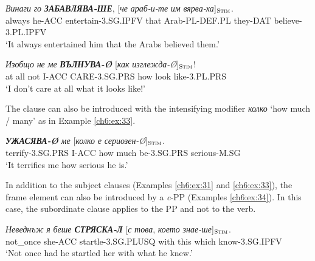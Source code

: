 \documentclass[output=paper,colorlinks,citecolor=brown]{langscibook}
\begin{document}
\begin{exe}  
\ex  \label{ch6:ex:31}
\gll \textit{Винаги} {\textit{го}} {\textit{\textbf{ЗАБАВЛЯВА-ШЕ}}}, [{\textit{че}} {\textit{араб-и-те}} {\textit{им}} {\textit{вярва-ха}}]$_{\text{\textsc{Stim}}}$. \\ 
{always}  {he-ACC} {entertain-3.SG.IPFV} {that} {Arab-PL-DEF.PL} {they-DAT} {believe-3.PL.IPFV}
\\ %
\glt `It always entertained him that the Arabs believed them.'
  
\ex  \label{ch6:ex:32}
\gll \textit{Изобщо} {\textit{не}} {\textit{ме}} {\textit{\textbf{ВЪЛНУВА-Ø}}} [{\textit{как}} {\textit{изглежда-Ø}}]$_{\text{\textsc{Stim}}}$! \\
{at all} {not}  {I-ACC} {CARE-3.SG.PRS} {how} {look like-3.PL.PRS}
\\ %
\glt `I don't care at all what it looks like!'
\end{exe}

The   clause can also be introduced with the intensifying modifier \textit{колко} `how much / many' as in Example \ref{ch6:ex:33}. 

\begin{exe} 
\ex  \label{ch6:ex:33} 
\gll \textit{\textbf{УЖАСЯВА-Ø}} {\textit{ме}}  [{\textit{колко}} {\textit{е}} {\textit{сериозен-Ø}}]$_{\text{\textsc{Stim}}}$. \\ 
{terrify-3.SG.PRS} {I-ACC} {how much} {be-3.SG.PRS} {serious-M.SG}
\\  %
\glt `It terrifies me how serious he is.'
\end{exe}

In addition to the subject clauses (Examples \ref{ch6:ex:31} and \ref{ch6:ex:33}), the frame element  can also be introduced by a \textit{c}-PP (Examples \ref{ch6:ex:34}). In this case, the subordinate clause applies to the PP and not to the verb.

\begin{exe} 
\ex  \label{ch6:ex:34} 
\gll \textit{Неведнъж} \textit{я} {\textit{беше \textbf{СТРЯСКА-Л}}} [{\textit{с}} {\textit{това}}, {\textit{което}} {\textit{знае-ше}}]$_{\text{\textsc{Stim}}}$. \\ 
{not\_once} {she-ACC} {startle-3.SG.PLUSQ} {with} {this} {which} {know-3.SG.IPFV}
\\  %
\glt `Not once had he startled her with what he knew.'
\end{exe}
\end{document}
